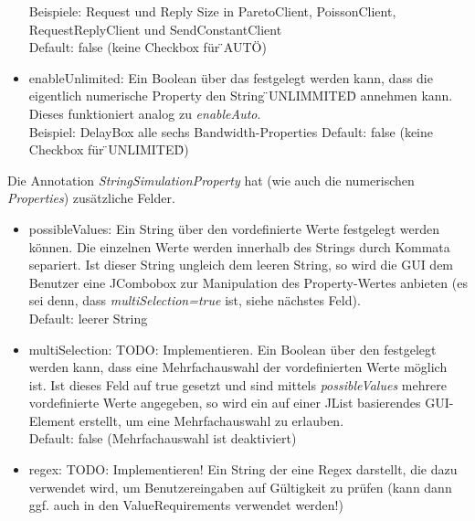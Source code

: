 \documentclass[a4paper, 11pt]{article} %
\begin{document}
\begin{itemize}
	Beispiele: Request und Reply Size in ParetoClient, PoissonClient, RequestReplyClient und SendConstantClient\\
	Default: false (keine Checkbox für \"{}AUTO\"{}) 
	\item enableUnlimited: Ein Boolean über das festgelegt werden kann, dass die eigentlich numerische Property den String \"{}UNLIMMITED\"{} annehmen kann. Dieses funktioniert analog zu \emph{enableAuto}.\\
	Beispiel: DelayBox alle sechs Bandwidth-Properties
	Default: false (keine Checkbox für \"{}UNLIMITED\"{})
\end{itemize}

Die Annotation \emph{StringSimulationProperty} hat (wie auch die numerischen \emph{Properties}) zusätzliche Felder.
\begin{itemize}
	\item possibleValues: Ein String über den vordefinierte Werte festgelegt werden können. Die einzelnen Werte werden innerhalb des Strings durch Kommata separiert. Ist dieser String ungleich dem leeren String, so wird die GUI dem Benutzer eine JCombobox zur Manipulation des Property-Wertes anbieten (es sei denn, dass \emph{multiSelection=true} ist, siehe nächstes Feld).\\
	Default: leerer String
	\item multiSelection: TODO: Implementieren. Ein Boolean über den festgelegt werden kann, dass eine Mehrfachauswahl der vordefinierten Werte möglich ist. Ist dieses Feld auf true gesetzt und sind mittels \emph{possibleValues} mehrere vordefinierte Werte angegeben, so wird ein auf einer JList basierendes GUI-Element erstellt, um eine Mehrfachauswahl zu erlauben.\\
	Default: false (Mehrfachauswahl ist deaktiviert) 
	\item regex: TODO: Implementieren! Ein String der eine Regex darstellt, die dazu verwendet wird, um Benutzereingaben auf Gültigkeit zu prüfen (kann dann ggf. auch in den ValueRequirements verwendet werden!)
\end{itemize}


\end{document}
